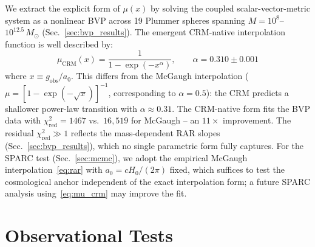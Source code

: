 \documentclass[aps,prd,twocolumn,superscriptaddress,nofootinbib]{revtex4-2}
\begin{document}
We extract the explicit form of $\mu(x)$ by solving the coupled scalar-vector-metric system as a nonlinear BVP across 19 Plummer spheres spanning $M = 10^{8}$--$10^{12.5}\,M_\odot$ (Sec.~\ref{sec:bvp_results}). The emergent CRM-native interpolation function is well described by:
\begin{equation}
\mu_{\mathrm{CRM}}(x) = \frac{1}{1 - \exp(-x^\alpha)}, \qquad \alpha = 0.310 \pm 0.001
\label{eq:mu_crm}
\end{equation}
where $x \equiv g_{\mathrm{obs}}/a_0$. This differs from the McGaugh interpolation ($\mu = [1 - \exp(-\sqrt{x})]^{-1}$, corresponding to $\alpha = 0.5$): the CRM predicts a shallower power-law transition with $\alpha \approx 0.31$. The CRM-native form fits the BVP data with $\chi^2_{\mathrm{red}} = 1467$ vs.\ $16{,}519$ for McGaugh -- an $11\times$ improvement. The residual $\chi^2_{\mathrm{red}} \gg 1$ reflects the mass-dependent RAR slopes (Sec.~\ref{sec:bvp_results}), which no single parametric form fully captures. For the SPARC test (Sec.~\ref{sec:mcmc}), we adopt the empirical McGaugh interpolation~\eqref{eq:rar} with $a_0 = cH_0/(2\pi)$ fixed, which suffices to test the cosmological anchor independent of the exact interpolation form; a future SPARC analysis using~\eqref{eq:mu_crm} may improve the fit.


\section{Observational Tests}
\label{sec:tests}
\end{document}
